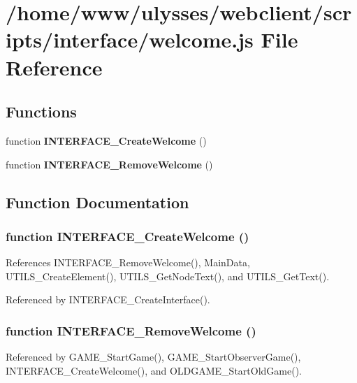 \section{/home/www/ulysses/webclient/scripts/interface/welcome.js File Reference}
\label{welcome_8js}
\subsection*{Functions}
\begin{CompactItemize}
\item 
function {\bf INTERFACE\_\-CreateWelcome} ()
\item 
function {\bf INTERFACE\_\-RemoveWelcome} ()
\end{CompactItemize}


\subsection{Function Documentation}
\subsubsection{\setlength{\rightskip}{0pt plus 5cm}function INTERFACE\_\-CreateWelcome ()}\label{welcome_8js_08edb81f74f4d70e8e9275afc4756181}




References INTERFACE\_\-RemoveWelcome(), MainData, UTILS\_\-CreateElement(), UTILS\_\-GetNodeText(), and UTILS\_\-GetText().

Referenced by INTERFACE\_\-CreateInterface().
\subsubsection{\setlength{\rightskip}{0pt plus 5cm}function INTERFACE\_\-RemoveWelcome ()}\label{welcome_8js_1fe27b085197d760c33b1a1db3f6c63e}




Referenced by GAME\_\-StartGame(), GAME\_\-StartObserverGame(), INTERFACE\_\-CreateWelcome(), and OLDGAME\_\-StartOldGame().